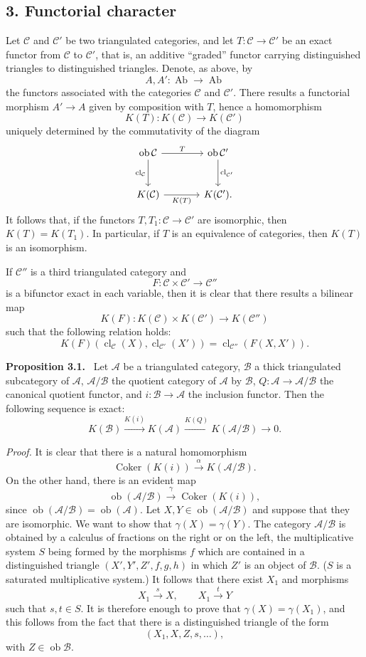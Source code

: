 \documentclass[11pt]{article}
\newenvironment{statement}[1]{\par\medskip\noindent\textbf{#1.}\ }{\par\medskip}
\providecommand{\Ob}{\operatorname{ob}}
\providecommand{\cC}{\mathcal C}
\providecommand{\Ob}{\operatorname{ob}}
\providecommand{\Ab}{\operatorname{Ab}}
\providecommand{\cC}{\mathcal C}
\providecommand{\cA}{\mathcal A}
\providecommand{\cB}{\mathcal B}
\providecommand{\Ab}{\operatorname{Ab}}
\providecommand{\Ob}{\operatorname{Ob}}
\providecommand{\Ob}{\operatorname{ob}}
\providecommand{\Ob}{\operatorname{Ob}}
\begin{document}
\subsection*{3. Functorial character}\label{sga5:VIII:subsection:3}

Let $\cC$ and $\cC'$ be two triangulated categories, and let $T:\cC\to\cC'$ be an exact functor from $\cC$ to $\cC'$, that is, an additive ``graded'' functor carrying distinguished triangles to distinguished triangles. Denote, as above, by
\[
A,A':\Ab\longrightarrow\Ab
\]
the functors associated with the categories $\cC$ and $\cC'$. There results a functorial morphism $A'\to A$ given by composition with $T$, hence a homomorphism
\[
K(T):K(\cC)\longrightarrow K(\cC')
\]
uniquely determined by the commutativity of the diagram
\[
\begin{tikzcd}[column sep=large,row sep=large]
\Ob\cC \arrow[r,"T"] \arrow[d,"\operatorname{cl}_{\cC}"']&
\Ob\cC' \arrow[d,"\operatorname{cl}_{\cC'}"]\\
K(\cC) \arrow[r,"K(T)"']& K(\cC').
\end{tikzcd}
\]
It follows that, if the functors $T,T_1:\cC\to\cC'$ are isomorphic, then $K(T)=K(T_1)$. In particular, if $T$ is an equivalence of categories, then $K(T)$ is an isomorphism.

If $\cC''$ is a third triangulated category and
\[
F:\cC\times\cC'\longrightarrow \cC''
\]
is a bifunctor exact in each variable, then it is clear that there results a bilinear map
\[
K(F):K(\cC)\times K(\cC')\longrightarrow K(\cC'')
\]
such that the following relation holds:
\[
K(F)(\operatorname{cl}_{\cC}(X),\operatorname{cl}_{\cC'}(X'))
=
\operatorname{cl}_{\cC''}(F(X,X')).
\]

\label{sga5:VIII:proposition:3.1}\begin{statement}{Proposition 3.1}
Let $\cA$ be a triangulated category, $\cB$ a thick triangulated subcategory of $\cA$, $\cA/\cB$ the quotient category of $\cA$ by $\cB$, $Q:\cA\to\cA/\cB$ the canonical quotient functor, and $i:\cB\to\cA$ the inclusion functor. Then the following sequence is exact:
\[
K(\cB)\xrightarrow{K(i)}K(\cA)\xrightarrow{K(Q)}K(\cA/\cB)\longrightarrow 0.
\]
\end{statement}

\emph{Proof.} It is clear that there is a natural homomorphism
\[
\operatorname{Coker}(K(i))\xrightarrow{\alpha}K(\cA/\cB).
\]
On the other hand, there is an evident map
\[
\Ob(\cA/\cB)\xrightarrow{\gamma}\operatorname{Coker}(K(i)),
\]
since $\Ob(\cA/\cB)=\Ob(\cA)$. Let $X,Y\in\Ob(\cA/\cB)$ and suppose that they are isomorphic. We want to show that $\gamma(X)=\gamma(Y)$. The category $\cA/\cB$ is obtained by a calculus of fractions on the right or on the left, the multiplicative system $S$ being formed by the morphisms $f$ which are contained in a distinguished triangle $(X',Y',Z',f,g,h)$ in which $Z'$ is an object of $\cB$. ($S$ is a saturated multiplicative system.) It follows that there exist $X_1$ and morphisms
\[
X_1\xrightarrow{s}X,\qquad X_1\xrightarrow{t}Y
\]
such that $s,t\in S$. It is therefore enough to prove that $\gamma(X)=\gamma(X_1)$, and this follows from the fact that there is a distinguished triangle of the form
\[
(X_1,X,Z,s,\ldots),
\]
with $Z\in\Ob\cB$.
\end{document}
